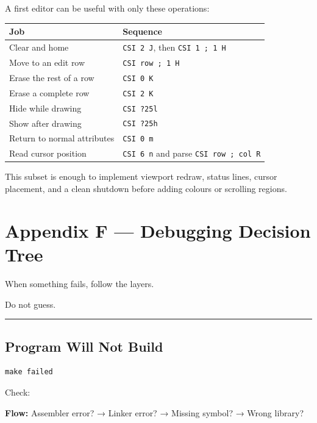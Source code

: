 \documentclass[
  oneside,
  openany]{book}
\begin{document}
A first editor can be useful with only these operations:

\begin{longtable}[]{@{}ll@{}}
\toprule\noalign{}
Job & Sequence \\
\midrule\noalign{}
\endhead
\bottomrule\noalign{}
\endlastfoot
Clear and home & \texttt{CSI\ 2\ J}, then \texttt{CSI\ 1\ ;\ 1\ H} \\
Move to an edit row & \texttt{CSI\ row\ ;\ 1\ H} \\
Erase the rest of a row & \texttt{CSI\ 0\ K} \\
Erase a complete row & \texttt{CSI\ 2\ K} \\
Hide while drawing & \texttt{CSI\ ?25l} \\
Show after drawing & \texttt{CSI\ ?25h} \\
Return to normal attributes & \texttt{CSI\ 0\ m} \\
Read cursor position & \texttt{CSI\ 6\ n} and parse
\texttt{CSI\ row\ ;\ col\ R} \\
\end{longtable}

This subset is enough to implement viewport redraw, status lines, cursor
placement, and a clean shutdown before adding colours or scrolling
regions.

\hypertarget{appendix-f-debugging-decision-tree}{%
\chapter{Appendix F --- Debugging Decision
Tree}\label{appendix-f-debugging-decision-tree}}

When something fails, follow the layers.

Do not guess.

\begin{center}\rule{0.5\linewidth}{0.5pt}\end{center}

\hypertarget{program-will-not-build}{%
\section{Program Will Not Build}\label{program-will-not-build}}

\begin{verbatim}
make failed
\end{verbatim}

Check:

\textbf{Flow:} Assembler error? → Linker error? → Missing symbol? →
Wrong library?
\end{document}
